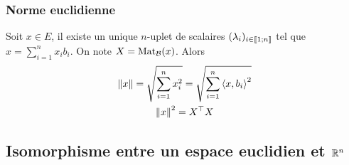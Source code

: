 \subsubsection{Norme euclidienne}

Soit \(x \in E\), il existe un unique \(n\)-uplet de scalaires \((\lambda_i)_{i \in \mathopen{\llbracket}1\mathclose{}\mathpunct{};n\mathclose{\rrbracket}}\) tel que \(x = \sum_{i=1}^n x_i b_i\). On note \(X = \mathrm{Mat}_{\mathcal{B}}(x)\). Alors
\begin{gather}
  \left\lVert x\right\rVert = \sqrt{\sum_{i=1}^n x_i^2}=\sqrt{\sum_{i=1}^n \left\langle{x},{b_i}\right\rangle^2} \\
  \left\lVert x\right\rVert^2 = X^\top X
\end{gather}

\subsection{Isomorphisme entre un espace euclidien et \(\mathbb{R}^n\)}

